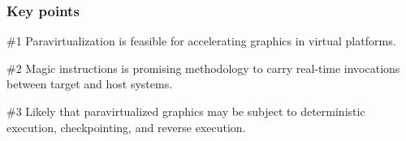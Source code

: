 
\begin{frame}
\frametitle{Key points}

\begin{block}{\#1}
	Paravirtualization is feasible for accelerating graphics in virtual platforms.
\end{block}

\begin{block}{\#2}
	Magic instructions is promising methodology to carry real-time invocations between target and host systems.
\end{block}

\begin{block}{\#3}
	Likely that paravirtualized graphics may be subject to deterministic execution, checkpointing, and reverse execution.
\end{block}

\end{frame}
